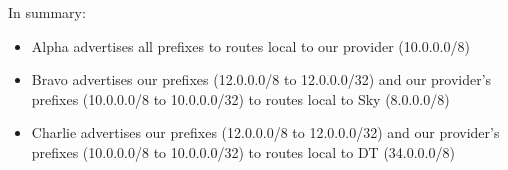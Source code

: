 In summary:

\begin{itemize}
  \item Alpha advertises all prefixes to routes local to our provider
  (10.0.0.0/8)
  \item Bravo advertises our prefixes (12.0.0.0/8 to 12.0.0.0/32) and our
  provider's prefixes (10.0.0.0/8 to 10.0.0.0/32) to routes local to Sky
  (8.0.0.0/8)
  \item Charlie advertises our prefixes (12.0.0.0/8 to 12.0.0.0/32) and our
  provider's prefixes (10.0.0.0/8 to 10.0.0.0/32) to routes local to DT
  (34.0.0.0/8)
\end{itemize}